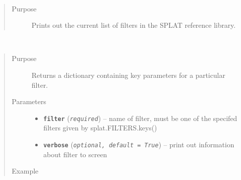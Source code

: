 \documentclass[letterpaper,10pt,english]{sphinxmanual}
\begin{document}
\begin{fulllineitems}
\label{api:splat.filterInfo}~\begin{quote}\begin{description}
\item[{Purpose}] \leavevmode
Prints out the current list of filters in the SPLAT reference library.

\end{description}\end{quote}

\end{fulllineitems}


\begin{fulllineitems}
\label{api:splat.filterProperties}~\begin{quote}\begin{description}
\item[{Purpose}] \leavevmode
Returns a dictionary containing key parameters for a particular filter.

\item[{Parameters}] \leavevmode\begin{itemize}
\item {} 
\textbf{\texttt{filter}} (\emph{\texttt{required}}) -- name of filter, must be one of the specifed filters given by splat.FILTERS.keys()

\item {} 
\textbf{\texttt{verbose}} (\emph{\texttt{optional, default = True}}) -- print out information about filter to screen

\end{itemize}

\item[{Example}] \leavevmode
\end{description}\end{quote}


\end{fulllineitems}
\end{document}
